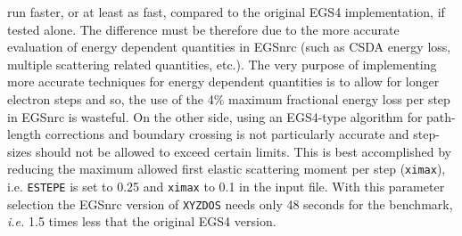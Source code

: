 run faster, or at least as fast, compared to the original EGS4
implementation, if tested alone. The difference must be therefore
due to the more accurate evaluation of energy dependent
quantities in EGSnrc (such as CSDA energy loss, multiple
scattering related quantities, etc.). The very purpose  of
implementing more accurate techniques for energy dependent
quantities is to allow for longer electron steps and so,
the use of the 4\% maximum fractional energy loss per step
in EGSnrc is wasteful. On the other side, using an
EGS4-type algorithm for path-length corrections and
boundary crossing is not particularly accurate and
step-sizes should not be allowed to exceed certain
limits. This is best accomplished by reducing the
maximum allowed first elastic scattering moment per step
({\tt ximax}), i.e.  {\tt ESTEPE} is set to 0.25 and
{\tt ximax} to 0.1 in the input file. With this parameter
selection the EGSnrc version of {\tt XYZDOS} needs only
48 seconds for the benchmark, {\em i.e.} 1.5 times less
that the original EGS4 version.


